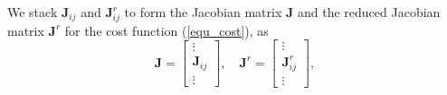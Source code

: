 \documentclass{vgtc}                          %
\begin{document}
We stack $\mathbf{J}_{ij}$ and $\mathbf{J}_{ij}^{r}$ to form the Jacobian matrix $\mathbf{J}$ and the reduced Jacobian matrix $\mathbf{J}^{r}$ for the cost function (\ref{equ_cost}), as
\begin{equation} \label{equ_J_Jr}
	\mathbf{J} = \begin{bmatrix}
		\vdots \\
		\mathbf{J}_{ij} \\
		\vdots
	\end{bmatrix}, \quad
	\mathbf{J}^{r} = \begin{bmatrix}
		\vdots \\
		\mathbf{J}_{ij}^{r} \\
		\vdots
	\end{bmatrix},
\end{equation}
\end{document}
